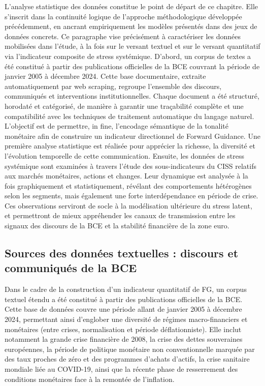 L’analyse statistique des données constitue le point de départ de ce chapitre. Elle s’inscrit dans la continuité logique de l’approche méthodologique développée précédemment, en ancrant empiriquement les modèles présentés dans des jeux de données concrets. Ce paragraphe vise précisément à caractériser les données mobilisées dans l’étude, à la fois sur le versant textuel et sur le versant quantitatif via l’indicateur composite de stress systémique. D’abord, un corpus de textes a été constitué à partir des publications officielles de la BCE couvrant la période de janvier 2005 à décembre 2024. Cette base documentaire, extraite automatiquement par web scraping, regroupe l’ensemble des discours, communiqués et interventions institutionnelles. Chaque document a été structuré, horodaté et catégorisé, de manière à garantir une traçabilité complète et une compatibilité avec les techniques de traitement automatique du langage naturel. L’objectif est de permettre, in fine, l’encodage sémantique de la tonalité monétaire afin de construire un indicateur directionnel de Forward Guidance. Une première analyse statistique est réalisée pour apprécier la richesse, la diversité et l’évolution temporelle de cette communication. Ensuite, les données de stress systémique sont examinées à travers l’étude des sous-indicateurs du CISS relatifs aux marchés monétaires, actions et changes. Leur dynamique est analysée à la fois graphiquement et statistiquement, révélant des comportements hétérogènes selon les segments, mais également une forte interdépendance en période de crise. Ces observations serviront de socle à la modélisation ultérieure du stress latent, et permettront de mieux appréhender les canaux de transmission entre les signaux des discours de la BCE et la stabilité financière de la zone euro.

\subsection{Sources des données textuelles : discours et communiqués de la BCE}

Dans le cadre de la construction d’un indicateur quantitatif de FG, un corpus textuel étendu a été constitué à partir des publications officielles de la BCE. Cette base de données couvre une période allant de janvier 2005 à décembre 2024, permettant ainsi d’englober une diversité de régimes macro-financiers et monétaires (entre crises, normalisation et période déflationniste). Elle inclut notamment la grande crise financière de 2008, la crise des dettes souveraines européennes, la période de politique monétaire non conventionnelle marquée par des taux proches de zéro et des programmes d’achats d’actifs, la crise sanitaire mondiale liée au COVID-19, ainsi que la récente phase de resserrement des conditions monétaires face à la remontée de l’inflation.\\


